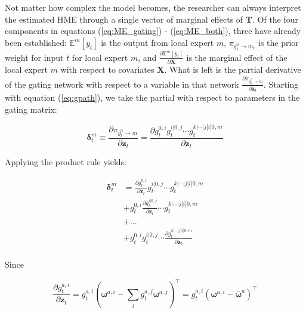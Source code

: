 \documentclass[12pt]{article}
\newcommand{\bw}[1]{\boldsymbol{\omega}^{#1}}
\newcommand{\mean}[1]{\bar{#1}}
\newcommand{\gateprod}[2]{\pi_{#1 \longrightarrow #2}}
\newcommand{\Eym}{\mathbb{E}^{m} \left[ y_{t} \right]}
\theoremstyle{definition}
\begin{document}
Not matter how complex the model becomes, the researcher can always interpret
the estimated HME through a single vector of marginal effects of $\boldsymbol{T}$.
Of the four components in equations (\ref{eq:ME_gating}) - (\ref{eq:ME_both}),
three have already been established: $\Eym$ is the output from local
expert $m$, $\gateprod{g^{0}_{t}}{m_{t}}$ is the prior weight for
input $t$ for local expert $m$, and $\frac{\partial \Eym}{{\partial \boldsymbol{X}}}$
is the marginal effect of the local expert $m$ with respect to covariates $\boldsymbol{X}$.
What is left is the partial derivative of the gating network with respect to a
variable in that network $\frac{\partial \gateprod{g^{0}_{t}}{m}}{\partial \boldsymbol{z}_{t}}$.
Starting with equation (\ref{eq:gpath}), we take the partial with
respect to parameters in the gating matrix:

\begin{equation} \label{eq:hme_gate_marginal_effect_1}
  \boldsymbol{\delta}^{m}_{t} \equiv \frac{\partial \gateprod{g^{0}_{t}}{m}}{\partial \boldsymbol{z}_{t}} = \frac{\partial g^{0, i}_{t} g^{i|0, j}_{t} \cdots g^{k|\cdots|j|i|0, m}_{t}}{\partial \boldsymbol{z}_{t}}
\end{equation}

Applying the product rule yields:

\begin{equation} \label{eq:hme_gate_marginal_effect_2}
  \begin{split}
    \boldsymbol{\delta}^{m}_{t} &= \frac{\partial g^{0, i}_{t}}{\partial \boldsymbol{z}_{t}} g^{i|0, j}_{t} \cdots g^{k|\cdots|j|i|0, m}_{t}                       \\
                                     &+ g^{0, i}_{t} \frac{\partial g^{i|0, j}_{t}}{\partial \boldsymbol{z}_{t}} \cdots g^{k|\cdots|j|i|0, m}_{t} \\
                                     &+ \dots                                                                                     \\
                                     &+ g^{0, i}_{t} g^{i|0, j}_{t} \cdots \frac{\partial g^{k|\cdots|j|i|0, m}_{t}}{\partial \boldsymbol{z}_{t}} \\
  \end{split}
\end{equation}

Since

\begin{equation} \label{eq:node_marginal_effect}
  \frac{\partial g^{a, i}_{t}}{\partial \boldsymbol{z}_{t}} = g^{a, i}_{t} \left( \bw{a, i} - \sum_{j} g^{a, j}_{t} \bw{a, j} \right)^{\top} = g^{a, i}_{t} \left( \bw{a, i} - \mean{\boldsymbol{\omega}}^{a} \right)^{\top}
\end{equation}
\end{document}
